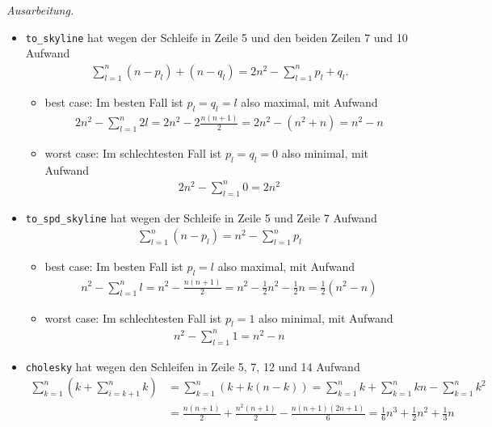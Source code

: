 \documentclass[titlepage]{article}
\newenvironment{ausarbeitung}{\vspace{3mm}\noindent\textit{Ausarbeitung.}}{}
\begin{document}
\begin{ausarbeitung}
	
	\begin{itemize}
		\item \texttt{to\_skyline} hat wegen der Schleife in Zeile 5 und den beiden Zeilen 7 und 10 Aufwand
		\begin{align*}
			\sum_{l=1}^{n} (n-p_l)+(n-q_l) = 2n^2-\sum_{l=1}^{n}p_l+q_l.
		\end{align*}
		
		\begin{itemize}
			\item best case: Im besten Fall ist $p_l = q_l = l$ also maximal, mit Aufwand
			\begin{align*}
				2n^2-\sum_{l=1}^{n}2l = 2n^2 - 2\frac{n(n+1)}{2} = 2n^2-(n^2+n) = n^2 - n
			\end{align*}
			
			\item worst case: Im schlechtesten Fall ist $p_l = q_l = 0$ also minimal, mit Aufwand
			\begin{align*}
				2n^2 - \sum_{l=1}^{n}0 = 2n^2
			\end{align*}
		\end{itemize}
		
		\item \texttt{to\_spd\_skyline} hat wegen der Schleife in Zeile 5 und Zeile 7 Aufwand 
		\begin{align*}
			\sum_{l=1}^{n}(n-p_l) = n^2 - \sum_{l=1}^{n}p_l
		\end{align*}
		\begin{itemize}
			\item best case: Im besten Fall ist $p_l = l$ also maximal, mit Aufwand 
			\begin{align*}
				n^2 - \sum_{l=1}^{n}l = n^2 - \frac{n(n+1)}{2} = n^2 - \frac{1}{2}n^2 - \frac{1}{2}n = \frac{1}{2}(n^2-n)
			\end{align*}
			\item worst case: Im schlechtesten Fall ist $p_l=1$ also minimal, mit Aufwand 
			\begin{align*}
				n^2 - \sum_{l=1}^{n}1 = n^2 - n
			\end{align*}
		\end{itemize}
	
		\item \texttt{cholesky} hat wegen den Schleifen in Zeile 5, 7, 12 und 14 Aufwand
		\begin{align*}
			\sum_{k=1}^{n}(k + \sum_{i=k+1}^{n}k) &= \sum_{k=1}^{n}(k+k(n-k)) = \sum_{k=1}^{n}k + \sum_{k=1}^{n}kn - \sum_{k=1}^{n}k^2 \\
			&= \frac{n(n+1)}{2} + \frac{n^2(n+1)}{2} - \frac{n(n+1)(2n+1)}{6} = \frac{1}{6}n^3 + \frac{1}{2}n^2 + \frac{1}{3}n
		\end{align*}
		

\end{itemize}
\end{ausarbeitung}
\end{document}
